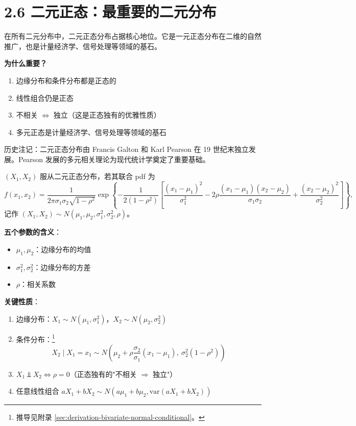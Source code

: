 \section{2.6 二元正态：最重要的二元分布}\label{sec:2.6}

在所有二元分布中，二元正态分布占据核心地位。它是一元正态分布在二维的自然推广，也是计量经济学、信号处理等领域的基石。

\textbf{为什么重要？}
\begin{enumerate}
\item 边缘分布和条件分布都是正态的
\item 线性组合仍是正态
\item 不相关 $\iff$ 独立（这是正态独有的优雅性质）
\item 多元正态是计量经济学、信号处理等领域的基石
\end{enumerate}

历史注记：二元正态分布由 Francis Galton 和 Karl Pearson 在 19 世纪末独立发展。Pearson 发展的多元相关理论为现代统计学奠定了重要基础。

\begin{definition}[二元正态分布]\label{def:bivariate-normal-ch2}
$(X_1, X_2)$ 服从二元正态分布，若其联合 pdf 为
\[
f(x_1, x_2) = \frac{1}{2\pi\sigma_1\sigma_2\sqrt{1-\rho^2}} \exp\left\{ -\frac{1}{2(1-\rho^2)} \left[ \frac{(x_1-\mu_1)^2}{\sigma_1^2} - 2\rho\frac{(x_1-\mu_1)(x_2-\mu_2)}{\sigma_1\sigma_2} + \frac{(x_2-\mu_2)^2}{\sigma_2^2} \right] \right\},
\]
记作 $(X_1, X_2) \sim N(\mu_1, \mu_2, \sigma_1^2, \sigma_2^2, \rho)$。
\end{definition}

\textbf{五个参数的含义}：
\begin{itemize}
\item $\mu_1, \mu_2$：边缘分布的均值
\item $\sigma_1^2, \sigma_2^2$：边缘分布的方差
\item $\rho$：相关系数
\end{itemize}

\textbf{关键性质}：

\begin{enumerate}
\item 边缘分布：$X_1 \sim N(\mu_1, \sigma_1^2)$，$X_2 \sim N(\mu_2, \sigma_2^2)$
\item 条件分布：\footnote{推导见附录 \cref{sec:derivation-bivariate-normal-conditional}。}
\begin{equation}\label{eq:bivariate-normal-conditional}
X_2 \mid X_1 = x_1 \sim N\left(\mu_2 + \rho\frac{\sigma_2}{\sigma_1}(x_1 - \mu_1), \ \sigma_2^2(1-\rho^2)\right)
\tag{2.6.1}
\end{equation}
\item $X_1 \Perp X_2 \iff \rho = 0$（正态独有的"不相关 $\Rightarrow$ 独立"）
\item 任意线性组合 $aX_1 + bX_2 \sim N(a\mu_1 + b\mu_2, \text{var}(aX_1 + bX_2))$
\end{enumerate}

